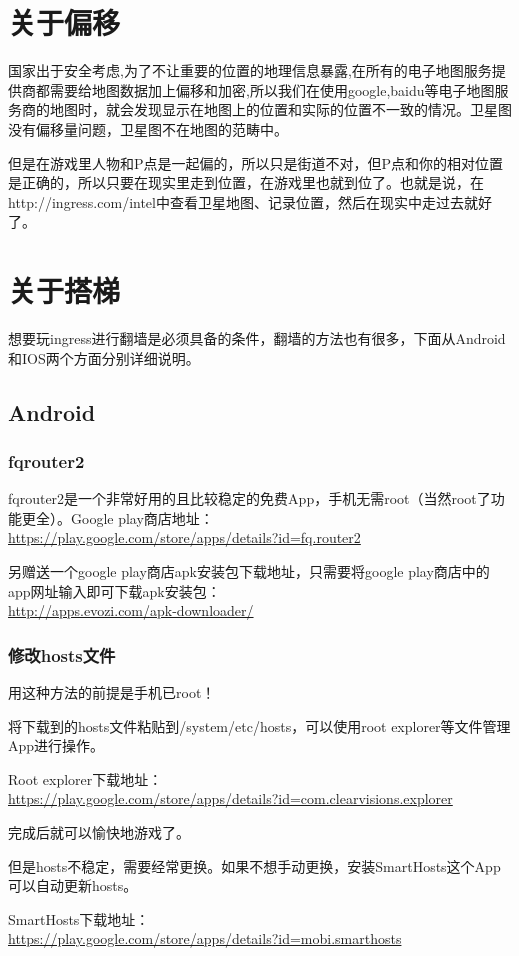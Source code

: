 \documentclass[12pt]{article}
\theoremstyle{definition}
\theoremstyle{remark}
\numberwithin{equation}{section}
\begin{document}
\section{关于偏移}
国家出于安全考虑,为了不让重要的位置的地理信息暴露,在所有的电子地图服务提供商都需要给地图数据加上偏移和加密,所以我们在使用google,baidu等电子地图服务商的地图时，就会发现显示在地图上的位置和实际的位置不一致的情况。卫星图没有偏移量问题，卫星图不在地图的范畴中。\par
但是在游戏里人物和P点是一起偏的，所以只是街道不对，但P点和你的相对位置是正确的，所以只要在现实里走到位置，在游戏里也就到位了。也就是说，在http://ingress.com/intel中查看卫星地图、记录位置，然后在现实中走过去就好了。

\section{关于搭梯}
想要玩ingress进行翻墙是必须具备的条件，翻墙的方法也有很多，下面从Android和IOS两个方面分别详细说明。

\subsection{Android}
\subsubsection{fqrouter2}
fqrouter2是一个非常好用的且比较稳定的免费App，手机无需root（当然root了功能更全）。Google play商店地址：\\
\url{https://play.google.com/store/apps/details?id=fq.router2} \par
另赠送一个google play商店apk安装包下载地址，只需要将google play商店中的app网址输入即可下载apk安装包：\\
\url{http://apps.evozi.com/apk-downloader/}
\subsubsection{修改hosts文件}
用这种方法的前提是手机已root！\par
将下载到的hosts文件粘贴到/system/etc/hosts，可以使用root explorer等文件管理App进行操作。\par
Root explorer下载地址：\\
\url{https://play.google.com/store/apps/details?id=com.clearvisions.explorer}\par
完成后就可以愉快地游戏了。\par
但是hosts不稳定，需要经常更换。如果不想手动更换，安装SmartHosts这个App可以自动更新hosts。\par
SmartHosts下载地址：\\
\url{https://play.google.com/store/apps/details?id=mobi.smarthosts}
\end{document}
